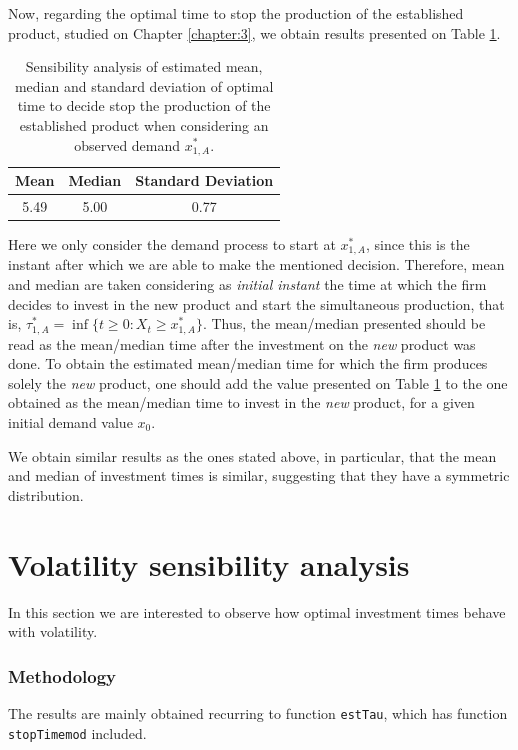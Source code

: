 Now, regarding the optimal time to stop the production of the established product, studied on Chapter \ref{chapter:3}, we obtain results presented on Table \ref{stoptime_t}.
\begin{table}[!htb]
	\caption{Sensibility analysis of estimated mean, median and standard deviation of optimal time to decide stop the production of the established product when considering an observed demand $x_{1,A}^*$.}
	\centering
	\begin{tabular}{ccc}
		Mean & Median & Standard Deviation \\ \hline
		5.49 & 5.00 & 0.77
	\end{tabular}
\label{stoptime_t}
\end{table}

Here we only consider the demand process to start at $x_{1,A}^*$, since this is the instant after which we are able to make the mentioned decision. Therefore, mean and median are taken considering as \textit{initial instant} the time at which the firm decides to invest in the new product and start the simultaneous production, that is, $\tau^*_{1,A}=\inf \{ t\geq 0: X_t \geq x^*_{1,A} \}$. Thus, the mean/median presented should be read as the mean/median time after the investment on the \textit{new} product was done. To obtain the estimated mean/median time for which the firm produces solely the \textit{new} product, one should add the value presented on Table \ref{stoptime_t} to the one obtained as the mean/median time to invest in the \textit{new} product, for a given initial demand value $x_0$.    

We obtain similar results as the ones stated above, in particular, that the mean and median of investment times is similar, suggesting that they have a symmetric distribution.


\section{Volatility sensibility analysis}

In this section we are interested to observe how optimal investment times behave with volatility.

\subsubsection{Methodology}

The results are mainly obtained recurring to function \texttt{estTau}, which has function \texttt{stopTimemod} included.

